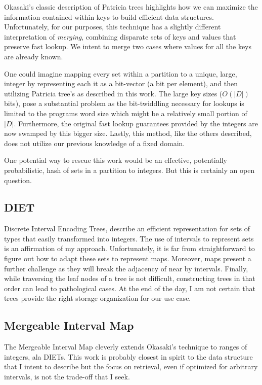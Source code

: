 \documentclass{article}
\begin{document}
Okasaki's classic description\cite{Okasaki1998} of Patricia trees highlights how
we can maximize the information contained within keys to build efficient data
structures.
Unfortunately, for our purposes, this technique has a slightly different
interpretation of \emph{merging},
combining disparate sets of keys and values that preserve fast lookup.
We intent to merge two cases where values for all the keys are already known.

One could imagine mapping every set within a partition to a unique, large,
integer by representing each it as a bit-vector (a bit per element), and then
utilizing Patricia tree's as described in this work.
The large key sizes ($O(|D|)$ bits),
pose a substantial problem as the bit-twiddling necessary for lookups is
limited to the programs word size which might be a relatively small portion
of $|D|$.
Furthermore, the original fast lookup guarantees provided by the integers are
now swamped by this bigger size.
Lastly, this method, like the others described, does not utilize our previous
knowledge of a fixed domain.

One potential way to rescue this work would be an effective,
potentially probabilistic,
hash of sets in a partition to integers.
But this is certainly an open question.

\subsection{DIET}

Discrete Interval Encoding Trees\cite{Erwig1993},
describe an efficient representation for sets of types that easily transformed
into integers.
The use of intervals to represent sets is an affirmation of my approach.
Unfortunately, it is far from straightforward to figure out how to adapt these
sets to represent maps.
Moreover, maps present a further challenge as they will break the adjacency of
near by intervals.
Finally,
while traversing the leaf nodes of a tree is not difficult,
constructing trees in that order can lead to pathological cases.
At the end of the day,
I am not certain that trees provide the right storage organization for our use
case.

\subsection{Mergeable Interval Map}

The Mergeable Interval Map\cite{Bonichon2010} cleverly extends Okasaki's
technique to ranges of integers, ala DIETs.
This work is probably closest in spirit to the
data structure that I intent to describe but the focus on retrieval,
even if optimized for arbitrary intervals,
is not the trade-off that I seek.
\end{document}
